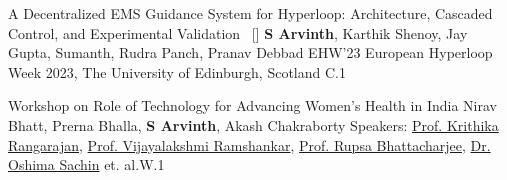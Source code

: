 \begin{publications}


\publication
    {A Decentralized EMS Guidance System for Hyperloop: Architecture, Cascaded Control, and Experimental Validation}{~ [\href{https://drive.google.com/file/d/1PAO-jJqQrPFEnobLXHsWObDxk04XRija/view?usp=sharing}{\small{\linkSymbol}}]}
    {\textbf{S Arvinth}, Karthik Shenoy, Jay Gupta, Sumanth, Rudra Panch, Pranav Debbad} 
	{EHW'23} {European Hyperloop Week 2023, The University of Edinburgh, Scotland}
    {\label{C1}C.1}
    

\end{publications}
\vspace{-4mm}


\begin{publications}

\publication
    {Workshop on Role of Technology for Advancing Women's Health in India}{}
    {Nirav Bhatt, Prerna Bhalla, \textbf{S Arvinth}, Akash Chakraborty}
    {} {Speakers: \href{https://www.ashoka.edu.in/profile/krithika-rangarajan/}{Prof. Krithika Rangarajan}, \href{https://www.linkedin.com/in/drvijayalakshmiramshankar/?originalSubdomain=in}{Prof. Vijayalakshmi Ramshankar}, \href{https://sites.google.com/view/rupsa-bhattacharjee-phd/bio}{Prof. Rupsa Bhattacharjee}, \href{https://www.linkedin.com/in/oshima-sachin-29aa8b16a/?originalSubdomain=in}{Dr. Oshima Sachin} et. al.}{\label{W1}W.1}
\end{publications}

\vspace{-3mm}